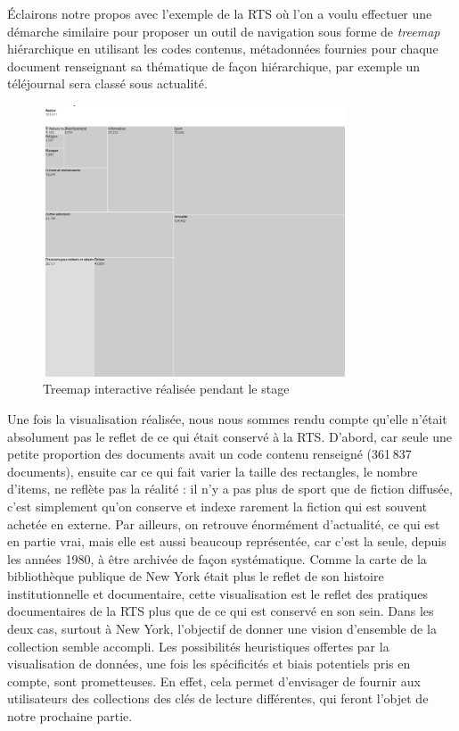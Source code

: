 Éclairons notre propos avec l’exemple de la RTS où l’on a voulu effectuer une démarche similaire pour proposer un outil de navigation sous forme de \textit{treemap} hiérarchique en utilisant les codes contenus, métadonnées fournies pour chaque document renseignant sa thématique de façon hiérarchique, par exemple un téléjournal sera classé sous actualité.



\begin{figure}[h!]
	\centering
	\includegraphics[width=0.8\textwidth]{images/image13.png}
	\caption{Treemap interactive réalisée pendant le stage}
	\label{fig:image13}
\end{figure}



Une fois la visualisation réalisée, nous nous sommes rendu compte qu’elle n’était absolument pas le reflet de ce qui était conservé à la RTS. D’abord, car seule une petite proportion des documents avait un code contenu renseigné (361 837 documents), ensuite car ce qui fait varier la taille des rectangles, le nombre d’items, ne reflète pas la réalité : il n’y a pas plus de sport que de fiction diffusée, c’est simplement qu’on conserve et indexe rarement la fiction qui est souvent achetée en externe. Par ailleurs, on retrouve énormément d’actualité, ce qui est en partie vrai, mais elle est aussi beaucoup représentée, car c’est la seule, depuis les années 1980, à être archivée de façon systématique. Comme la carte de la bibliothèque publique de New York était plus le reflet de son histoire institutionnelle et documentaire, cette visualisation est le reflet des pratiques documentaires de la RTS plus que de ce qui est conservé en son sein. Dans les deux cas, surtout à New York, l'objectif de donner une vision d'ensemble de la collection semble accompli. Les possibilités heuristiques offertes par la visualisation de données, une fois les spécificités et biais potentiels pris en compte, sont prometteuses. En effet, cela permet d'envisager de fournir aux utilisateurs des collections des clés de lecture différentes, qui feront l'objet de notre prochaine partie.

